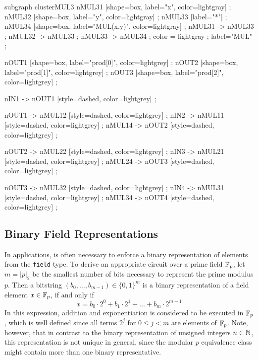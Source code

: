 \begin{example}
\begin{center}
{    subgraph clusterMUL3 {
    nMUL31 [shape=box, label="x", color=lightgray] ;
    nMUL32 [shape=box, label="y", color=lightgray] ;
    nMUL33 [label="*"] ;
    nMUL34 [shape=box, label="MUL(x,y)", color=lightgray] ;
    nMUL31 -> nMUL33 ;
    nMUL32 -> nMUL33 ;
    nMUL33 -> nMUL34 ;
    color = lightgray ;
    label="MUL" ;
  }

  nOUT1 [shape=box, label="prod[0]", color=lightgrey] ;
  nOUT2 [shape=box, label="prod[1]", color=lightgrey] ;
  nOUT3 [shape=box, label="prod[2]", color=lightgrey] ;
  
  nIN1 -> nOUT1 [style=dashed, color=lightgrey] ;
  
  nOUT1 -> nMUL12 [style=dashed, color=lightgrey] ;
  nIN2 -> nMUL11 [style=dashed, color=lightgrey] ;
  nMUL14 -> nOUT2 [style=dashed, color=lightgrey] ;
 
  nOUT2 -> nMUL22 [style=dashed, color=lightgrey] ;
  nIN3 -> nMUL21 [style=dashed, color=lightgrey] ;
  nMUL24 -> nOUT3 [style=dashed, color=lightgrey] ; 
  
  nOUT3 -> nMUL32 [style=dashed, color=lightgrey] ;
  nIN4 -> nMUL31 [style=dashed, color=lightgrey] ;
  nMUL34 -> nOUT4 [style=dashed, color=lightgrey] ;  
  
}
\end{center}
\end{example}
\subsection{Binary Field Representations} In applications, is often necessary to enforce a binary representation of elements from the \texttt{field} type. To derive an appropriate circuit over a prime field $\mathbb{F}_p$, let $m=|p|_2$ be the smallest number of bits necessary to represent the prime modulus $p$. Then a bitstring $(b_0,\ldots,b_{m-1})\in \{0,1\}^m$ is a binary representation of a field element $x\in\mathbb{F}_p$, if and only if
$$
x = b_0\cdot 2^0 + b_1\cdot 2^1 + \ldots + b_m\cdot 2^{m-1}
$$ 
In this expression, addition and exponentiation is considered to be executed in $\mathbb{F}_p$, which is well defined since all terms $2^j$ for $0\leq j < m$ are elements of $\mathbb{F}_p$. Note, however, that in contrast to the binary representation of unsigned integers $n\in\mathbb{N}$, this representation is not unique in general, since the modular $p$ equivalence class might contain more than one binary representative. 


